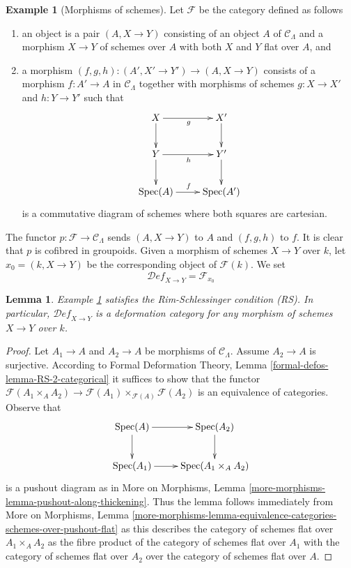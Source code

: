 \documentclass{stacks-project}
\theoremstyle{plain}
\newtheorem{lemma}[subsection]{Lemma}
\theoremstyle{definition}
\newtheorem{example}[subsection]{Example}
\theoremstyle{remark}
\numberwithin{equation}{subsection}
\def\Spec{\mathop{\mathrm{Spec}}}
\def\Deformationcategory{\mathcal{D}\!\mathit{ef}}
\begin{document}
\begin{example}[Morphisms of schemes]
\label{example-schemes-morphisms}
Let $\mathcal{F}$ be the category defined as follows
\begin{enumerate}
\item an object is a pair $(A, X \to Y)$ consisting of an
object $A$ of $\mathcal{C}_\Lambda$ and a morphism
$X \to Y$ of schemes over $A$ with both $X$ and $Y$ flat over $A$, and
\item a morphism $(f, g, h) : (A', X' \to Y') \to (A, X \to Y)$ consists of
a morphism $f : A' \to A$ in $\mathcal{C}_\Lambda$ together
with morphisms of schemes $g : X \to X'$ and $h : Y \to Y'$ such that
$$
\xymatrix{
X \ar[r]_g \ar[d] & X' \ar[d] \\
Y \ar[r]_h \ar[d] & Y' \ar[d] \\
\Spec(A) \ar[r]^f & \Spec(A')
}
$$
is a commutative diagram of schemes where both squares are cartesian.
\end{enumerate}
The functor $p : \mathcal{F} \to \mathcal{C}_\Lambda$ sends $(A, X \to Y)$
to $A$ and $(f, g, h)$ to $f$. It is clear that $p$ is cofibred in groupoids.
Given a morphism of schemes $X \to Y$ over $k$, let $x_0 = (k, X \to Y)$
be the corresponding object of $\mathcal{F}(k)$. We set
$$
\Deformationcategory_{X \to Y} = \mathcal{F}_{x_0}
$$
\end{example}

\begin{lemma}
\label{lemma-schemes-morphisms-RS}
Example \ref{example-schemes-morphisms}
satisfies the Rim-Schlessinger condition (RS).
In particular, $\Deformationcategory_{X \to Y}$ is a deformation category
for any morphism of schemes $X \to Y$ over $k$.
\end{lemma}

\begin{proof}
Let $A_1 \to A$ and $A_2 \to A$ be morphisms of $\mathcal{C}_\Lambda$.
Assume $A_2 \to A$ is surjective. According to
Formal Deformation Theory, Lemma
\ref{formal-defos-lemma-RS-2-categorical}
it suffices to show that the functor
$\mathcal{F}(A_1 \times_A A_2) \to
\mathcal{F}(A_1) \times_{\mathcal{F}(A)} \mathcal{F}(A_2)$
is an equivalence of categories.
Observe that
$$
\xymatrix{
\Spec(A) \ar[r] \ar[d] & \Spec(A_2) \ar[d] \\
\Spec(A_1) \ar[r] &
\Spec(A_1 \times_A A_2)
}
$$
is a pushout diagram as in More on Morphisms, Lemma
\ref{more-morphisms-lemma-pushout-along-thickening}.
Thus the lemma follows immediately from
More on Morphisms, Lemma
\ref{more-morphisms-lemma-equivalence-categories-schemes-over-pushout-flat}
as this describes the category of schemes flat over $A_1 \times_A A_2$
as the fibre product of the category of schemes flat over $A_1$
with the category of schemes flat over $A_2$ over the category of
schemes flat over $A$.
\end{proof}
\end{document}
